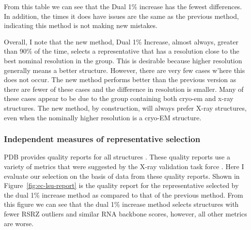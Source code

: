 From this table we can see that the Dual 1\% increase has the fewest differences.
In addition, the times it does have issues are the same as the previous method,
indicating this method is not making new mistakes.

Overall, I note that the new method, Dual 1\% Increase, almost always, greater
than 90\% of the time, selects a representative that has a resolution close to
the best nominal resolution in the group. This is desirable because higher
resolution generally means a better structure. However, there are very few cases
w’here this does not occur. The new method performs better than the previous
version as there are fewer of these cases and the difference in resolution is
smaller. Many of these cases appear to be due to the group containing both
cryo-em and x-ray structures. The new method, by construction, will always
prefer X-ray structures, even when the nominally higher resolution is a cryo-EM
structure.

\subsubsection{Independent measures of representative selection}

PDB provides quality reports for all structures \cite{Gore2012}. These quality
reports use a variety of metrics that were suggested by the X-ray validation
task force \cite{Gore2012}. Here I evaluate our selection on the basis of data
from these quality reports. Shown in Figure~\ref{fig:ec-lsu-report} is the
quality report for the representative selected by the dual 1\% increase method
as compared to that of the previous method. From this figure we can see that the
dual 1\% increase method selects structures with fewer RSRZ outliers and similar
RNA backbone scores, however, all other metrics are worse.

